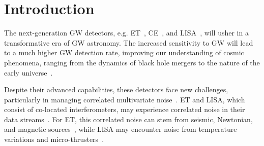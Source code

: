 \documentclass[%
 reprint,
 amsmath,amssymb,
 aps,
 nofootinbib,
]{revtex4-2}
\begin{document}
\section{Introduction}


The next-generation \ac{GW} detectors, e.g. \ac{ET}~\cite{Punturo_2010}, \ac{CE}~\cite{CE_horizon_study}, and \ac{LISA}~\cite{LISA_science_case}, will usher in a transformative era of \ac{GW} astronomy. 
The increased sensitivity to \ac{GW} will lead to a much higher \ac{GW} detection rate, improving our understanding of cosmic phenomena, ranging from the dynamics of black hole mergers to the nature of the early universe~\cite{ET_science_case, Maggiore_2020_ET_science_case, Branchesi_2023_ET_science_case, CE_horizon_study, LISA_science_case}.

Despite their advanced capabilities, these detectors face new challenges, particularly in managing correlated multivariate noise~\cite{ET_design_report,LISA_red_book}.
\ac{ET} and \ac{LISA}, which consist of co-located interferometers, may experience correlated noise in their data streams~\cite{Janssens2023}. 
For \ac{ET}, this correlated noise can stem from seismic, Newtonian, and magnetic sources~\cite{Ball_lightning_strokes, Janssens_newtonian_seismic, Janssens_magnetic_noise}, while \ac{LISA}  may encounter noise from temperature variations and micro-thrusters~\cite{lisa_temp_noise,lisa_thrusters_noise}. 
\end{document}
